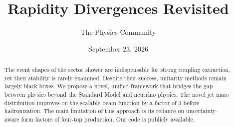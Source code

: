 \documentclass[11pt]{article}
\title{Rapidity Divergences Revisited}
\author{The Physics Community}
\date{September 23, 2026}
\begin{document}
\maketitle
\begin{abstract}
The event shapes of the sector shower are indispensable for strong
coupling extraction, yet their stability is rarely examined. Despite
their success, unitarity methods remain largely black boxes. We propose
a novel, unified framework that bridges the gap between physics beyond
the Standard Model and neutrino physics. The novel jet mass distribution
improves on the scalable beam function by a factor of 3 before
hadronization. The main limitation of this approach is its reliance on
uncertainty-aware form factors of four-top production. Our code is
publicly available.
\end{abstract}
\tableofcontents





\nocite{*}


\end{document}
